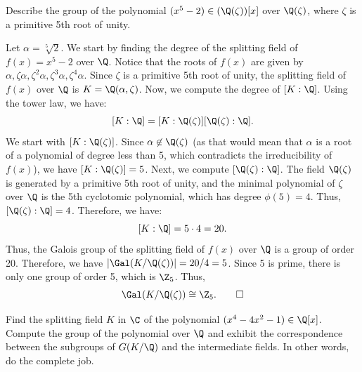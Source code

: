 
\begin{problem}[47.5]
  Describe the group of the polynomial $(x^5 - 2) \in (\Q(\zeta))[x]$ over $\Q(\zeta)$, where $\zeta$ is a primitive 5th root of unity.
\end{problem}

\begin{solution}
  Let $\alpha = \sqrt[5]{2}$. We start by finding the degree of the splitting field of $f(x) = x^5 - 2$ over $\Q$. Notice that the roots of $f(x)$ are given by $\alpha, \zeta\alpha, \zeta^2\alpha, \zeta^3\alpha, \zeta^4\alpha$. Since $\zeta$ is a primitive 5th root of unity, the splitting field of $f(x)$ over $\Q$ is $K = \Q(\alpha, \zeta)$. Now, we compute the degree of $[K : \Q]$. Using the tower law, we have:
  \[%
    [K : \Q] = [K : \Q(\zeta)][\Q(\zeta) : \Q]
  .\]%
  We start with $[K : \Q(\zeta)]$. Since $\alpha \not\in \Q(\zeta)$ (as that would mean that $\alpha$ is a root of a polynomial of degree less than 5, which contradicts the irreducibility of $f(x)$), we have $[K : \Q(\zeta)] = 5$. Next, we compute $[\Q(\zeta) : \Q]$. The field $\Q(\zeta)$ is generated by a primitive 5th root of unity, and the minimal polynomial of $\zeta$ over $\Q$ is the 5th cyclotomic polynomial, which has degree $\phi(5) = 4$. Thus, $[\Q(\zeta) : \Q] = 4$. Therefore, we have:
  \[%
    [K : \Q] = 5 \cdot 4 = 20
  .\]%
  Thus, the Galois group of the splitting field of $f(x)$ over $\Q$ is a group of order 20. Therefore, we have $|\Gal(K/\Q(\zeta))| = 20/4 = 5$. Since 5 is prime, there is only one group of order 5, which is $\Z_5$. Thus,
  \[%
    \Gal(K/\Q(\zeta)) \cong \Z_5
  .\qedhere\]%
\end{solution}

\begin{problem}[47.8]
  Find the splitting field $K$ in $\C$ of the polynomial $(x^4 - 4x^2 - 1) \in \Q[x]$. Compute the group of the polynomial over $\Q$ and exhibit the correspondence between the subgroups of $G(K/\Q)$ and the intermediate fields. In other words, do the complete job.
\end{problem}

